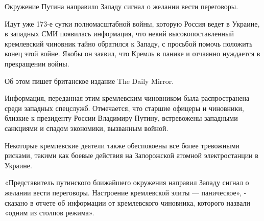  
 
 
 
 

Окружение Путина направило Западу сигнал о желании вести переговоры.

Идут уже 173-е сутки полномасштабной войны, которую Россия ведет в Украине, в
западных СМИ появилась информация, что некий высокопоставленный кремлевский
чиновник тайно обратился к Западу, с просьбой помочь положить конец этой войне.
Якобы он заявил, что Кремль в панике и отчаянно нуждается в прекращении войны.

Об этом пишет британское издание The Daily Mirror.

Информация, переданная этим кремлевским чиновником была распространена среди
западных спецслужб. Отмечается, что старшие офицеры и чиновники, близкие к
президенту России Владимиру Путину, встревожены западными санкциями и спадом
экономики, вызванным войной.

Некоторые кремлевские деятели также обеспокоены все более тревожными рисками,
такими как боевые действия на Запорожской атомной электростанции в Украине.

«Представитель путинского ближайшего окружения направил Западу сигнал о желании
вести переговоры. Настроение кремлевской элиты — паническое», - сказано в
отчете об информации от кремлевского чиновника, которого назвали «одним из
столпов режима».
